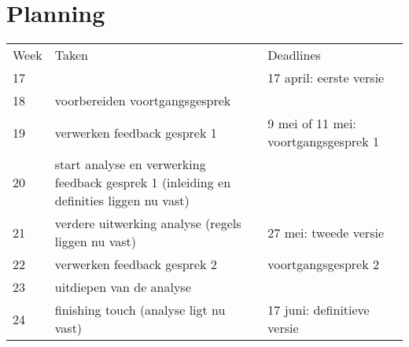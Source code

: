 \section{Planning}
\label{sec:planning}

\begin{tabular}{ l p{} l }
	Week & Taken & Deadlines \\
	17 &
	   & 17 april: eerste versie \\
	18 & voorbereiden voortgangsgesprek
	   & \\
	19 & verwerken feedback gesprek 1
	   & 9 mei of 11 mei: voortgangsgesprek 1 \\
	20 & start analyse en verwerking feedback gesprek 1 (inleiding en definities liggen nu vast)
	   & \\
	21 & verdere uitwerking analyse (regels liggen nu vast)
	   & 27 mei: tweede versie \\
	22 & verwerken feedback gesprek 2
	   & voortgangsgesprek 2 \\
	23 & uitdiepen van de analyse
	   & \\
	24 & finishing touch (analyse ligt nu vast)
	   & 17 juni: definitieve versie \\
\end{tabular}

